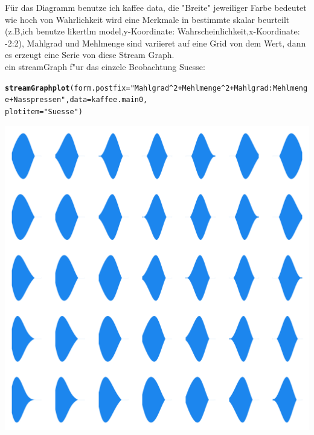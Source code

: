\documentclass[a4paper]{report}\usepackage{graphicx, color}
\makeatletter
\def\maxwidth{ %
  \ifdim\Gin@nat@width>\linewidth
    \linewidth
  \else
    \Gin@nat@width
  \fi
}
\newcommand{\hlfunctioncall}[1]{\textcolor[rgb]{0.501960784313725,0,0.329411764705882}{\textbf{#1}}}%
\newcommand{\hlstring}[1]{\textcolor[rgb]{0.6,0.6,1}{#1}}%
\newenvironment{kframe}{%
 \def\at@end@of@kframe{}%
 \ifinner\ifhmode%
  \def\at@end@of@kframe{\end{minipage}}%
  \begin{minipage}{\columnwidth}%
 \fi\fi%
 \def\FrameCommand##1{\hskip\@totalleftmargin \hskip-\fboxsep
 \colorbox{shadecolor}{##1}\hskip-\fboxsep
     \hskip-\linewidth \hskip-\@totalleftmargin \hskip\columnwidth}%
 \MakeFramed {\advance\hsize-\width
   \@totalleftmargin\z@ \linewidth\hsize
   \@setminipage}}%
 {\par\unskip\endMakeFramed%
 \at@end@of@kframe}
\newenvironment{knitrout}{}{} %
\makeatother
\begin{document}
F\"ur das Diagramm benutze ich kaffee data, die "Breite" jeweiliger Farbe bedeutet wie hoch von Wahrlichkeit wird eine Merkmale in bestimmte skalar beurteilt (z.B,ich benutze likertlm model,y-Koordinate: Wahrscheinlichkeit,x-Koordinate: -2:2),  Mahlgrad und Mehlmenge sind variieret auf eine Grid von dem Wert, dann es erzeugt eine Serie von
diese Stream Graph.\\
ein streamGraph f"ur das einzele Beobachtung Suesse:



\begin{knitrout}
\color{fgcolor}\begin{kframe}
\begin{alltt}
\hlfunctioncall{streamGraphplot}(form.postfix = \hlstring{"Mahlgrad^2+Mehlmenge^2+Mahlgrad:Mehlmenge+Nasspressen"}, data = kaffee.main0, 
    plotitem = \hlstring{"Suesse"})
\end{alltt}
\end{kframe}

{\centering \includegraphics[width=\maxwidth]{./plot_suesse} 

}



\end{knitrout}
\end{document}
